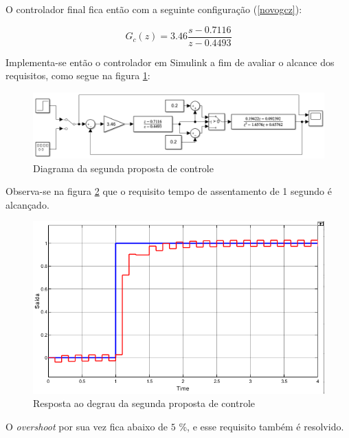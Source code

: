 \documentclass[a4paper,11pt]{article}
\begin{document}
O controlador final fica então com a seguinte configuração (\ref{novogcz}):

\begin{equation}
G_{c}(z)=3.46\frac{s - 0.7116}{z - 0.4493}
\label{novogcz}
\end{equation}

Implementa-se então o controlador em Simulink a fim de avaliar o alcance dos requisitos, como segue na figura \ref{fig:projetoavanco}:

\begin{figure}[H]
    \centering
    \includegraphics[width=\linewidth]{src/tex/img/controle_2.PNG}
    \caption{Diagrama da segunda proposta de controle}
    \label{fig:projetoavanco}
\end{figure}

Observa-se na figura \ref{fig:degrauavanco} que o requisito tempo de assentamento de 1 segundo é alcançado.

\begin{figure}[H]
    \centering
    \includegraphics[width=\linewidth]{src/tex/img/saida_controle_2.png}
    \caption{Resposta ao degrau da segunda proposta de controle}
    \label{fig:degrauavanco}
\end{figure}

O \textit{overshoot} por sua vez fica abaixo de $5$ \%, e esse requisito também é resolvido.
\end{document}
